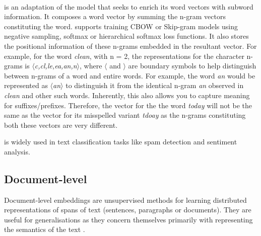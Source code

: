 \paragraph{\fasttext}
\fasttext \citep{Bojanowski2017} is an adaptation of the \wordtovec model that seeks to enrich its word vectors with subword information. It composes a word vector by summing the n-gram vectors constituting the word. \fasttext supports training CBOW or Skip-gram models using negative sampling, softmax or hierarchical softmax loss functions. It also stores the positional information of these n-grams embedded in the resultant vector. For example, for the word \textit{clean}, with n = 2, the \fasttext representations for the character n-grams is \textit{$\langle$c,cl,le,ea,an,n$\rangle$}, where $\langle$ and $\rangle$ are boundary symbols to help distinguish between n-grams of a word and entire words. For example, the word \textit{an} would be represented as \textit{$\langle$an$\rangle$} to distinguish it from the identical n-gram \textit{an} observed in \textit{clean} and other such words. Inherently, this also allows you to capture meaning for suffixes/prefixes.
Therefore, the vector for the the word \textit{today} will not be the same as the vector for its misspelled variant \textit{tdoay} as the n-grams constituting both these vectors are very different.

\fasttext is widely used in text classification tasks like spam detection and sentiment analysis.

\subsection{Document-level}
Document-level embeddings are unsupervised methods for learning distributed representations of spans of text (sentences, paragraphs or documents). They are useful for generalisations as they concern themselves primarily with representing the semantics of the text \citep{Le2014}.
